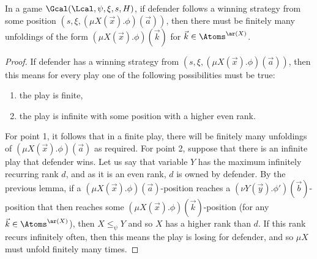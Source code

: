 \begin{lemma}\label{lem:parityNom}
	In a game $\Gcal(\Lcal, \psi, \xi, s, H)$, if defender follows a winning strategy from some position $(s, \xi, (\mu X(\vec x).\phi)(\vec a))$,
	then there must be finitely many unfoldings of the form $(\mu X(\vec x).\phi)(\vec k)$ for $\vec k \in \Atoms^{\ar(X)}$. 
\end{lemma}
\begin{proof}
	If defender has a winning strategy from $(s, \xi, (\mu X(\vec x).\phi)(\vec a))$, then this means for every play one of the following possibilities must be true:
	\begin{enumerate}
		\item the play is finite,
		\item the play is infinite with some position with a higher even rank.
	\end{enumerate}
	For point 1, it follows that in a finite play, there will be finitely many unfoldings of $(\mu X(\vec x).\phi)(\vec a)$ as required.
	For point 2, suppose that there is an infinite play that defender wins.
	Let us say that variable $Y$ has the maximum infinitely recurring rank $d$, and as it is an even rank, $d$ is owned by defender.
	By the previous lemma, if a $(\mu X(\vec x).\phi)(\vec a)$-position reaches a $(\nu Y(\vec y).\phi')(\vec b)$-position that then reaches some $(\mu X(\vec x).\phi)(\vec k)$-position (for any $\vec k \in \Atoms^{\ar(X)}$), then $X \le_\psi Y$ and so $X$ has a higher rank than $d$.
	If this rank recurs infinitely often, then this means the play is losing for defender, and so $\mu X$ must unfold finitely many times.
\end{proof}

